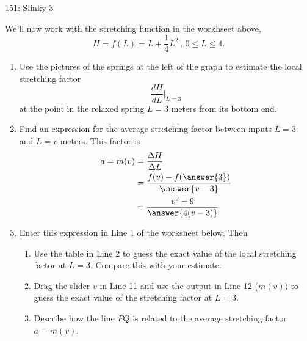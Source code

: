 \documentclass{ximera}
\begin{document}
\begin{example}
\begin{onlineOnly}
    \begin{center}
\end{center}
\end{onlineOnly}

\href{https://www.desmos.com/calculator/vjjibjkdrz}{151: Slinky 3}

We'll now work with the stretching function in the workhseet above,
\[
      H = f(L) = L + \frac{1}{4}L^2 \, , \, 0\leq L \leq 4.
\]

\begin{enumerate}
\item Use the pictures of the springs at the left of the graph to estimate the local stretching factor
\[
  \frac{dH}{dL}\Big|_{L=3}
\]
at the point in the relaxed spring $L=3$ meters from its bottom end.

\item Find an expression for the average stretching factor between inputs $L=3$ and $L=v$ meters. This factor is
\begin{align*}
  a= m(v) &= \frac{\Delta H}{\Delta L} \\
              &= \frac{f(v) - f(\answer{3})}{\answer{v-3}} \\
              &=\frac{v^2-9}{\answer{4(v-3)}}  
\end{align*}
             
\item Enter this expression in Line 1 of the worksheet below. Then
\begin{enumerate}
\item Use the table in Line 2 to guess the exact value of the local stretching factor at $L=3$. Compare this with your estimate.

\item Drag the slider $v$ in Line 11 and use the output in Line 12 ($m(v))$ to guess the exact value of the stretching factor at $L=3$.

\item Describe how the line $PQ$ is related to the average stretching factor $a=m(v)$. 
\end{enumerate}

\begin{onlineOnly}
    \begin{center}
\end{center}
\end{onlineOnly}


\end{enumerate}
\end{example}
\end{document}
